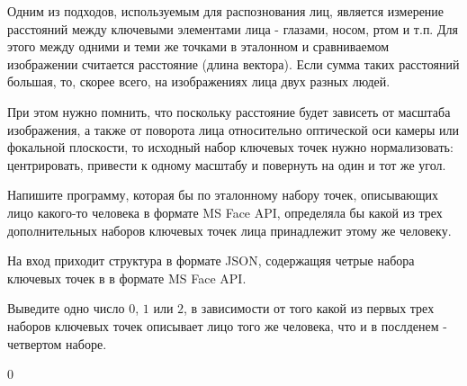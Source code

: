 
Одним из подходов, используемым для распознования лиц, является измерение расстояний между ключевыми элементами лица - глазами, носом, ртом и т.п. Для этого между одними и теми же точками в эталонном и сравниваемом изображении считается расстояние (длина вектора). Если сумма таких расстояний большая, то, скорее всего, на изображениях лица двух разных людей.

При этом нужно помнить, что поскольку расстояние будет зависеть от масштаба изображения, а также от поворота лица относительно оптической оси камеры или фокальной плоскости, то исходный набор ключевых точек нужно нормализовать: центрировать, привести к одному масштабу и повернуть на один и тот же угол.

Напишите программу, которая бы по эталонному набору точек, описывающих лицо какого-то человека в формате MS Face API, определяла бы какой из трех дополнительных наборов ключевых точек лица принадлежит этому же человеку.


На вход приходит структура в формате JSON, содержащяя четрые набора ключевых точек в в формате MS Face API.

\outputfmtSection

Выведите одно число $0$, $1$ или $2$, в зависимости от того какой из первых трех наборов ключевых точек описывает лицо того же человека, что и в послденем - четвертом наборе.

\begin{myverbbox}[\small]{\vinput} 
    [{"faceRectangle":{"top":228,"left":119,"width":311,"height":311},
    "faceLandmarks":{"pupilLeft":{"x":210,"y":306}, ... ]
\end{myverbbox}
\begin{myverbbox}[\small]{\voutput}
    0
\end{myverbbox}


